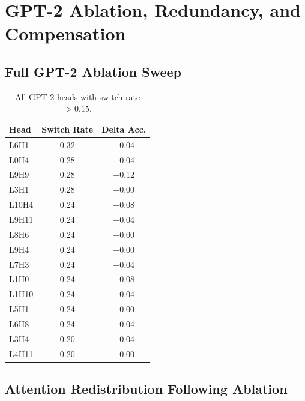 \documentclass[11pt]{article}
\begin{document}


\clearpage

\appendix

\section{GPT-2 Ablation, Redundancy, and Compensation}
\label{app:gpt2}

\subsection{Full GPT-2 Ablation Sweep}
\label{app:full_sweep}

\begin{table}[H]
\caption{All GPT-2 heads with switch rate $> 0.15$.}
\label{tab:full_sweep}
\centering\small
\begin{tabular}{lcc}
\toprule
\textbf{Head} & \textbf{Switch Rate} & \textbf{Delta Acc.} \\
\midrule
L6H1   & 0.32 & $+$0.04 \\
L0H4   & 0.28 & $+$0.04 \\
L9H9   & 0.28 & $-$0.12 \\
L3H1   & 0.28 & $+$0.00 \\
L10H4  & 0.24 & $-$0.08 \\
L9H11  & 0.24 & $-$0.04 \\
L8H6   & 0.24 & $+$0.00 \\
L9H4   & 0.24 & $+$0.00 \\
L7H3   & 0.24 & $-$0.04 \\
L1H0   & 0.24 & $+$0.08 \\
L1H10  & 0.24 & $+$0.04 \\
L5H1   & 0.24 & $+$0.00 \\
L6H8   & 0.24 & $-$0.04 \\
L3H4   & 0.20 & $-$0.04 \\
L4H11  & 0.20 & $+$0.00 \\
\bottomrule
\end{tabular}
\end{table}

\subsection{Attention Redistribution Following Ablation}
\label{app:compensation}
\end{document}
